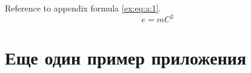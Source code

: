 \documentclass[xelatex,big]{G7-32-2017}
\begin{document}
\lipsum[3-5]

Reference to appendix formula \eqref{ex:eq:a:1}.
\begin{equation}
    \label{ex:eq:a:1}
    e = mC^2
\end{equation}

\chapter{Еще один пример приложения}

\lipsum[1-2]




% 

% 





% 


% 


% 
% 
\end{document}
